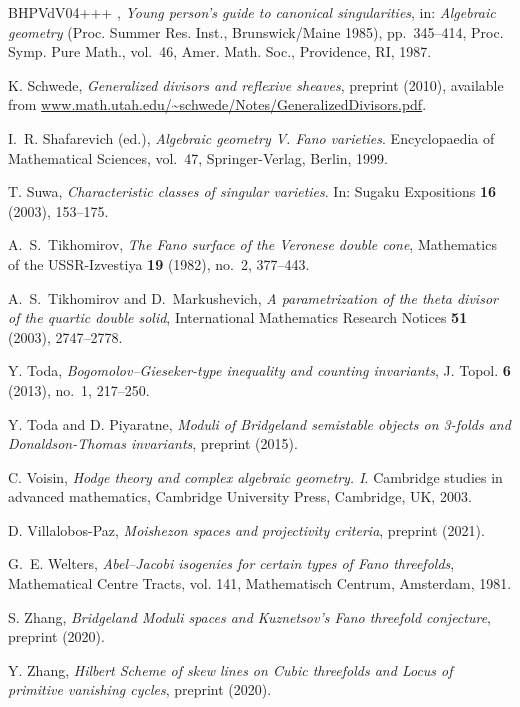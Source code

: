 \documentclass[11pt]{amsart}
\theoremstyle{definition}
\begin{document}
\begin{thebibliography}{BHPVdV04+++}
\bysame, \emph{Young person's guide to canonical singularities}, in: \emph{Algebraic geometry} (Proc. Summer Res. Inst., Brunswick/Maine 1985), pp.~345--414, Proc. {S}ymp. {P}ure {M}ath., vol.~46, Amer. Math. Soc., Providence, RI, 1987.

K. Schwede, \emph{Generalized divisors and reflexive sheaves}, preprint (2010), available from \url{www.math.utah.edu/~schwede/Notes/GeneralizedDivisors.pdf}.

I.~R. Shafarevich (ed.), \emph{Algebraic geometry V. Fano
  varieties}. Encyclopaedia of
  Mathematical Sciences, vol.~47, Springer-Verlag, Berlin, 1999.

T. Suwa, \emph{Characteristic classes of singular varieties}. In: 
Sugaku Expositions \textbf{16} (2003), 153--175.

A.~S.~Tikhomirov, \emph{The {F}ano surface of the {V}eronese double cone},
  Mathematics of the {USSR}-Izvestiya \textbf{19} (1982), no.~2, 377--443.

A.~S.~Tikhomirov and D.~Markushevich, \emph{A parametrization of the theta
  divisor of the quartic double solid}, International Mathematics Research
  Notices \textbf{51} (2003), 2747--2778.

Y. Toda, \emph{Bogomolov--{G}ieseker-type inequality and counting
  invariants}, J. Topol. \textbf{6} (2013), no.~1, 217--250.

Y. Toda and D. Piyaratne, \emph{Moduli of {B}ridgeland semistable objects on
  3-folds and {D}onaldson-{T}homas invariants}, preprint  (2015).

C. Voisin, \emph{Hodge theory and complex algebraic geometry. I}.
  Cambridge studies in advanced mathematics, Cambridge University Press,
  Cambridge, UK, 2003.

D. Villalobos-Paz, \emph{Moishezon spaces and projectivity criteria}, preprint  (2021).

G.~E. Welters, \emph{Abel--{J}acobi isogenies for certain types of {F}ano
  threefolds}, Mathematical Centre Tracts, vol. 141, Mathematisch Centrum,
  Amsterdam, 1981.

S. Zhang, \emph{Bridgeland Moduli spaces and Kuznetsov's Fano threefold
  conjecture}, preprint  (2020).

Y. Zhang, \emph{Hilbert Scheme of skew lines on Cubic threefolds and
  Locus of primitive vanishing cycles}, preprint  (2020).

\end{thebibliography}
 
\end{document}
